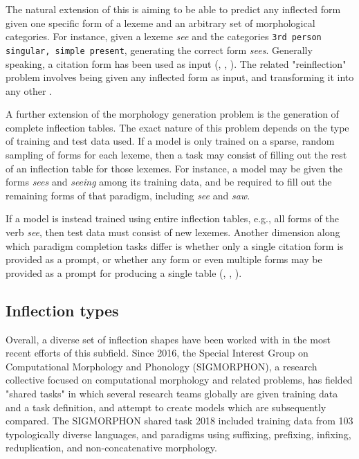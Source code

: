 The natural extension of this is aiming to be able to predict any inflected form given one specific form of a lexeme and an arbitrary set of morphological categories. For instance, given a lexeme \textit{see} and the categories \texttt{3rd person singular, simple present}, generating the correct form \textit{sees}. Generally speaking, a citation form has been used as input (\cite{Durrett2013}, \cite{Faruqui2015}, \cite{Cotterell2017a}). The related "reinflection" problem involves being given any inflected form as input, and transforming it into any other \parencite{Cotterell2016}.

A further extension of the morphology generation problem is the generation of complete inflection tables. The exact nature of this problem depends on the type of training and test data used. If a model is only trained on a sparse, random sampling of forms for each lexeme, then a task may consist of filling out the rest of an inflection table for those lexemes. For instance, a model may be given the forms \textit{sees} and \textit{seeing} among its training data, and be required to fill out the remaining forms of that paradigm, including \textit{see} and \textit{saw}. 

If a model is instead trained using entire inflection tables, e.g., all forms of the verb \textit{see}, then test data must consist of new lexemes. Another dimension along which paradigm completion tasks differ is whether only a single citation form is provided as a prompt, or whether any form or even multiple forms may be provided as a prompt for producing a single table (\cite{Hulden2014}, \cite{Ahlberg2015}, \cite{Cotterell2017a}).

\subsection{Inflection types}

Overall, a diverse set of inflection shapes have been worked with in the most recent efforts of this subfield. Since 2016, the Special Interest Group on Computational Morphology and Phonology (SIGMORPHON), a research collective focused on computational morphology and related problems, has fielded "shared tasks" in which several research teams globally are given training data and a task definition, and attempt to create models which are subsequently compared. The SIGMORPHON shared task 2018 included training data from 103 typologically diverse languages, and paradigms using suffixing, prefixing, infixing, reduplication, and non-concatenative morphology. 

